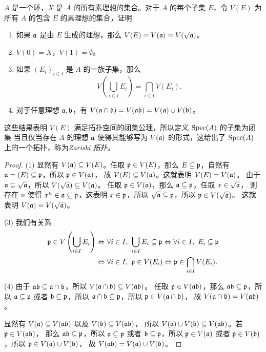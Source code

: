 \begin{problem}
  $A$ 是一个环，$X$ 是 $A$ 的所有素理想的集合。对于 $A$ 的每个子集 $E$，令 $V(E)$
  为所有 $A$ 的包含 $E$ 的素理想的集合，证明
  \begin{enumerate}
    \item 如果 $\mathfrak{a}$ 是由 $E$ 生成的理想，那么 $V(E)=V(\mathfrak{a})=V(\sqrt{\mathfrak{a}})$。
    \item $V(0)=X$，$V(1)=\emptyset$。
    \item 如果 $(E_i)_{i\in I}$ 是 $A$ 的一族子集，那么
    \[
      V\left(\bigcup_{i\in I}E_i\right)  =\bigcap_{i\in I}V(E_i).
    \]
    \item 对于任意理想 $\mathfrak{a},\mathfrak{b}$，有
    $V(\mathfrak{a}\cap\mathfrak{b})=V(\mathfrak{ab})=V(\mathfrak{a})\cup V(\mathfrak{b})$。
  \end{enumerate}
  这些结果表明 $V(E)$ 满足拓扑空间的闭集公理，所以定义 $\operatorname{Spec}(A)$ 的子集为闭集
  当且仅当存在 $A$ 的理想 $\mathfrak{a}$ 使得其能够写为 $V(\mathfrak{a})$ 的形式，这给出了
  $\operatorname{Spec}(A)$ 上的一个拓扑，称为\emph{Zariski 拓扑}。
\end{problem}
\begin{proof}
  (1) 显然有 $V(\mathfrak{a})\subseteq  V(E)$。任取 $\mathfrak{p}\in V(E)$，那么
  $E\subseteq \mathfrak{p}$，自然有 $\mathfrak{a}=(E)\subseteq \mathfrak{p}$，所以 $\mathfrak{p}\in V(\mathfrak{a})$，
  故 $V(E)\subseteq V(\mathfrak{a})$。这就表明 $V(E)=V(\mathfrak{a})$。
  由于 $\mathfrak{a}\subseteq\sqrt{\mathfrak{a}}$，所以 $V(\sqrt{\mathfrak{a}})\subseteq V(\mathfrak{a})$。
  任取 $\mathfrak{p}\in V(\mathfrak{a})$，那么 $\mathfrak{a}\subseteq \mathfrak{p}$，任取 $x\in\sqrt{\mathfrak{a}}$，
  则存在 $n$ 使得 $x^n\in\mathfrak{a}\subseteq \mathfrak{p}$，这表明 $x\in\mathfrak{p}$，所以
  $\sqrt{\mathfrak{a}}\subseteq \mathfrak{p}$，所以 $\mathfrak{p}\in V(\sqrt{\mathfrak{a}})$。
  这就表明 $V(\mathfrak{a})=V(\sqrt{\mathfrak{a}})$。

  (3) 我们有关系
  \begin{align*}
    \mathfrak{p}\in V\left(\bigcup_{i\in I}E_i\right)&\Leftrightarrow
    \forall i\in I,\ \bigcup_{i\in I} E_i\subseteq \mathfrak{p}\Leftrightarrow
    \forall i\in I,\ E_i\subseteq \mathfrak{p}\\
    &\Leftrightarrow \forall i\in I,\ \mathfrak{p}\in V(E_i)\Leftrightarrow
    \mathfrak{p}\in\bigcap_{i\in I}V(E_i).
  \end{align*}

  (4) 由于 $\mathfrak{ab}\subseteq \mathfrak{a}\cap\mathfrak{b}$，所以 $V(\mathfrak{a}\cap\mathfrak{b})\subseteq V(\mathfrak{ab})$。
  任取 $\mathfrak{p}\in V(\mathfrak{ab})$，那么 $\mathfrak{ab}\subseteq \mathfrak{p}$，所以
  $\mathfrak{a}\subseteq \mathfrak{p}$ 或者 $\mathfrak{b}\subseteq\mathfrak{p}$，所以
  $\mathfrak{a}\cap\mathfrak{b}\subseteq \mathfrak{p}$，所以 $\mathfrak{p}\in V(\mathfrak{a}\cap\mathfrak{b})$，
  故 $V(\mathfrak{a}\cap\mathfrak{b})=V(\mathfrak{ab})$。

  显然有 $V(\mathfrak{a})\subseteq V(\mathfrak{ab})$ 以及 $V(\mathfrak{b})\subseteq V(\mathfrak{ab})$，
  所以 $V(\mathfrak{a})\cup V(\mathfrak{b})\subseteq V(\mathfrak{ab})$。若 $\mathfrak{p}\in V(\mathfrak{ab})$，
  那么 $\mathfrak{ab}\subseteq \mathfrak{p}$，所以
  $\mathfrak{a}\subseteq \mathfrak{p}$ 或者 $\mathfrak{b}\subseteq\mathfrak{p}$，所以 $\mathfrak{p}\in V(\mathfrak{a})$
  或者 $\mathfrak{p}\in V(\mathfrak{b})$，所以 $\mathfrak{p}\in V(\mathfrak{a})\cup V(\mathfrak{b})$，
  故 $V(\mathfrak{ab})=V(\mathfrak{a})\cup V(\mathfrak{b})$。
\end{proof}

